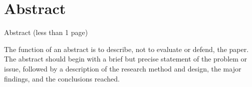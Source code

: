 \chapter{Abstract}

Abstract (less than 1 page)

The function of an abstract is to describe, not to evaluate or defend, the paper. The abstract should begin with a brief but precise statement of the problem or issue, followed by a description of the research method and design, the major findings, and the conclusions reached.

\Keywords{\InsertThesisKeywords}

\endinput